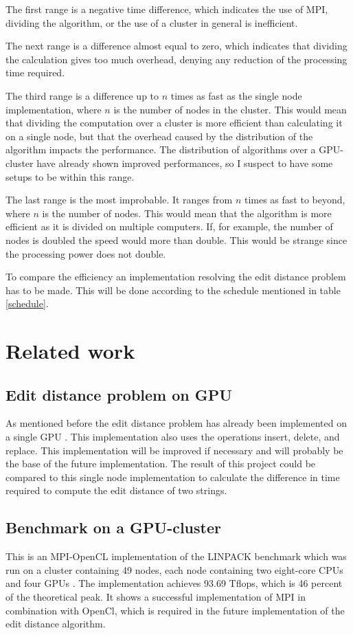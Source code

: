 \documentclass{sig-alternate-br}
\begin{document}
The first range is a negative time difference, which indicates the use of MPI, dividing the algorithm, or the use of a cluster in general is inefficient.

The next range is a difference almost equal to zero, which indicates that dividing the calculation gives too much overhead, denying any reduction of the processing time required.

The third range is a difference up to $n$ times as fast as the single node implementation, where $n$ is the number of nodes in the cluster.
This would mean that dividing the computation over a cluster is more efficient than calculating it on a single node, but that the overhead caused by the distribution of the algorithm impacts the performance.
The distribution of algorithms over a GPU-cluster have already shown improved performances, so I suspect to have some setups to be within this range.

The last range is the most improbable. It ranges from $n$ times as fast to beyond, where $n$ is the number of nodes.
This would mean that the algorithm is more efficient as it is divided on multiple computers.
If, for example, the number of nodes is doubled the speed would more than double.
This would be strange since the processing power does not double.

To compare the efficiency an implementation resolving the edit distance problem has to be made. This will be done according to the schedule mentioned in table \ref{schedule}.

\section{Related work}
\subsection{Edit distance problem on GPU}
As mentioned before the edit distance problem has already been implemented on a single GPU \cite{Heus:GPGPU}.
This implementation also uses the operations insert, delete, and replace.
This implementation will be improved if necessary and will probably be the base of the future implementation.
The result of this project could be compared to this single node implementation to calculate the difference in time required to compute the edit distance of two strings.

\balancecolumns
\subsection{Benchmark on a GPU-cluster}
This is an MPI-OpenCL implementation of the LINPACK benchmark which was run on a cluster containing 49 nodes, each node containing two eight-core CPUs and four GPUs \cite{Cluster}.
The implementation achieves 93.69 Tflops, which is 46 percent of the theoretical peak.
It shows a successful implementation of MPI in combination with OpenCl, which is required in the future implementation of the edit distance algorithm.
\end{document}
